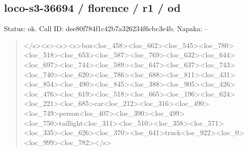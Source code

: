 \documentclass[10pt,a4paper]{article}
\begin{document}
\subsection*{loco-s3-36694 / florence / r1 / od}
Status: ok. Call ID: dee80f784f1c42b7a326234f6cbc3e4b. Napaka: --
\begin{quote}\footnotesize
</s>\allowbreak{}<s>\allowbreak{}<s>\allowbreak{}<s>\allowbreak{}box<loc\_458>\allowbreak{}<loc\_66\allowbreak{}2>\allowbreak{}<loc\_545>\allowbreak{}<loc\_780>\allowbreak{}<loc\_518>\allowbreak{}<lo\allowbreak{}c\_653>\allowbreak{}<loc\_587>\allowbreak{}<loc\_769>\allowbreak{}<loc\_632\allowbreak{}>\allowbreak{}<loc\_644>\allowbreak{}<loc\_697>\allowbreak{}<loc\_744>\allowbreak{}<loc\allowbreak{}\_589>\allowbreak{}<loc\_647>\allowbreak{}<loc\_637>\allowbreak{}<loc\_743>\allowbreak{}\allowbreak{}<loc\_740>\allowbreak{}<loc\_620>\allowbreak{}<loc\_786>\allowbreak{}<loc\_\allowbreak{}688>\allowbreak{}<loc\_811>\allowbreak{}<loc\_431>\allowbreak{}<loc\_854>\allowbreak{}<\allowbreak{}loc\_490>\allowbreak{}<loc\_845>\allowbreak{}<loc\_388>\allowbreak{}<loc\_9\allowbreak{}05>\allowbreak{}<loc\_426>\allowbreak{}<loc\_476>\allowbreak{}<loc\_619>\allowbreak{}<l\allowbreak{}oc\_518>\allowbreak{}<loc\_665>\allowbreak{}<loc\_196>\allowbreak{}<loc\_62\allowbreak{}4>\allowbreak{}<loc\_221>\allowbreak{}<loc\_685>\allowbreak{}car<loc\_212>\allowbreak{}\allowbreak{}<loc\_316>\allowbreak{}<loc\_490>\allowbreak{}<loc\_749>\allowbreak{}perso\allowbreak{}n<loc\_407>\allowbreak{}<loc\_390>\allowbreak{}<loc\_499>\allowbreak{}<loc\allowbreak{}\_750>\allowbreak{}taillight<loc\_311>\allowbreak{}<loc\_510>\allowbreak{}\allowbreak{}<loc\_358>\allowbreak{}<loc\_571>\allowbreak{}<loc\_335>\allowbreak{}<loc\_\allowbreak{}626>\allowbreak{}<loc\_370>\allowbreak{}<loc\_641>\allowbreak{}truck<loc\_\allowbreak{}922>\allowbreak{}<loc\_0>\allowbreak{}<loc\_999>\allowbreak{}<loc\_782>\allowbreak{}</s\allowbreak{}>\allowbreak{}
\end{quote}
\end{document}
